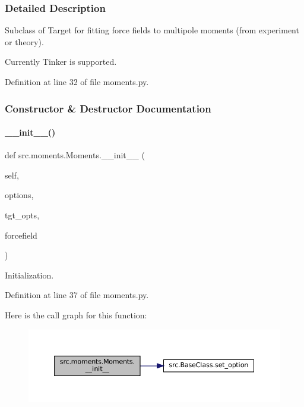 \subsubsection{Detailed Description}
Subclass of Target for fitting force fields to multipole moments (from experiment or theory). 

Currently Tinker is supported. 

Definition at line 32 of file moments.\+py.



\subsubsection{Constructor \& Destructor Documentation}
\mbox{\label{classsrc_1_1moments_1_1Moments_a19bb50056e254cd95ed28c3665585327}} 
\paragraph{\texorpdfstring{\+\_\+\+\_\+init\+\_\+\+\_\+()}{\_\_init\_\_()}}
{\footnotesize\ttfamily def src.\+moments.\+Moments.\+\_\+\+\_\+init\+\_\+\+\_\+ (\begin{DoxyParamCaption}\item[{}]{self,  }\item[{}]{options,  }\item[{}]{tgt\+\_\+opts,  }\item[{}]{forcefield }\end{DoxyParamCaption})}



Initialization. 



Definition at line 37 of file moments.\+py.

Here is the call graph for this function\+:
\nopagebreak
\begin{figure}[H]
\begin{center}
\leavevmode
\includegraphics[width=350pt]{classsrc_1_1moments_1_1Moments_a19bb50056e254cd95ed28c3665585327_cgraph}
\end{center}
\end{figure}


